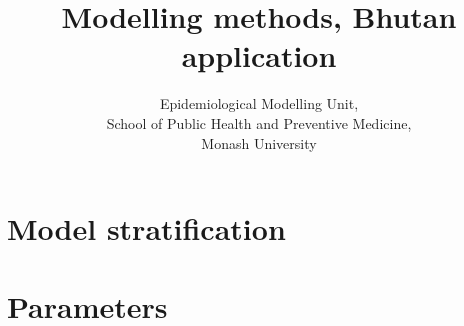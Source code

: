 \documentclass{article}
\author{
    Epidemiological Modelling Unit,
    \\ School of Public Health and Preventive Medicine,
    \\ Monash University
}
\title{Modelling methods, Bhutan application}
\begin{document}
\maketitle



\section{Model stratification}



\section{Parameters}


\newpage
\printbibliography
\end{document}

